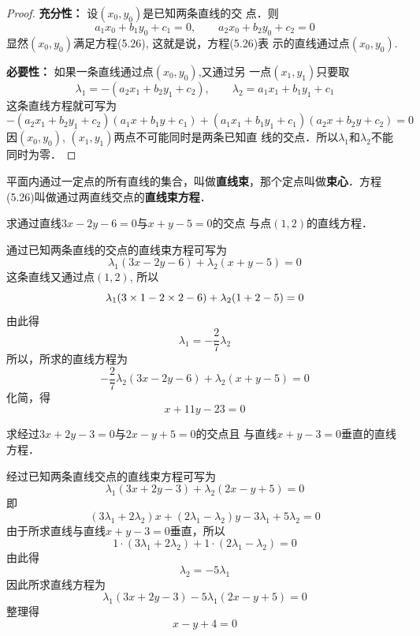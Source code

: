 \begin{proof}
\textbf{充分性：} 设$(x_0, y_0)$是已知两条直线的交
点．则
\[a_1x_0+b_1y_0+c_1=0,\qquad a_2x_0+b_2y_0+c_2=0\]
显然$(x_0, y_0)$满足方程(5.26), 这就是说，方程(5.26)表
示的直线通过点$(x_0, y_0)$.

\textbf{必要性：} 如果一条直线通过点$(x_0, y_0)$,又通过另
一点$(x_1,y_1)$只要取
\[\lambda_1=-(a_2x_1+b_2y_1+c_2),\qquad \lambda_2=a_1x_1+b_1y_1+c_1\]
这条直线方程就可写为
\[-(a_2x_1+b_2y_1+c_2)(a_1x+b_1y+c_1)+(a_1x_1+b_1y_1+c_1)(a_2x+b_2y+c_2)=0\]
因$(x_0, y_0)$, $(x_1,y_1)$两点不可能同时是两条已知直
线的交点．所以$\lambda_1$和$\lambda_2$不能
同时为零．
\end{proof}

平面内通过一定点的所有直线的集合，叫做\textbf{直线束}，那个定点叫做\textbf{束心}．方程(5.26)叫做通过两直线交点的\textbf{直线束方程}．

\begin{figure}[htp]
    \centering
{}
    \caption{}
\end{figure}

\begin{example}
    求通过直线$3x-2y-6=0$与$x+y-5=0$的交点
与点$(1,2)$的直线方程．
\end{example}

\begin{solution}
    通过已知两条直线的交点的直线束方程可写为
\[\lambda_1(3x-2y-6)+\lambda_2(x+y-5)=0\]
这条直线又通过点$(1,2)$, 所以
\[\lambda_1(3\times1-2\times2-6)+\lambda_2(1+2-5)=0\]
由此得
\[\lambda_1=-\frac{2}{7}\lambda_2\]
所以，所求的直线方程为
\[-\frac{2}{7}\lambda_2(3x-2y-6)+\lambda_2(x+y-5)=0\]
化简，得
\[x+11y-23=0\]
\end{solution}

\begin{example}
    求经过$3x+2y-3=0$与$2x-y+5=0$的交点且
与直线$x+y-3=0$垂直的直线方程．
\end{example}

\begin{solution}
    经过已知两条直线交点的直线束方程可写为
\[\lambda_1(3x+2y-3)+\lambda_2(2x-y+5)=0\]
即
\[(3\lambda_1+2\lambda_2)x+(2\lambda_1-\lambda_2)y-3\lambda_1+5\lambda_2=0\]
由于所求直线与直线$x+y-3=0$垂直，所以
\[1\cdot (3\lambda_1+2\lambda_2)+1\cdot (2\lambda_1-\lambda_2)=0\]
由此得
\[\lambda_2=-5\lambda_1\]
因此所求直线方程为
\[\lambda_1(3x+2y-3)-5\lambda_1(2x-y+5)=0\]
整理得
\[x-y+4=0\]
\end{solution}


